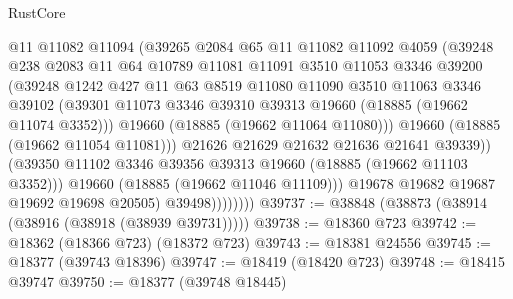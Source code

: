 \begin{lexlean}{RustCore}
\begin{coremodule}
                          @11
                          @11082
                          @11094
                          (@39265
                            @2084
                            @65
                            @11
                            @11082
                            @11092
                            @4059
                            (@39248
                              @238
                              @2083
                              @11
                              @64
                              @10789
                              @11081
                              @11091
                              @3510
                              @11053
                              @3346
                              @39200
                              (@39248
                                @1242
                                @427
                                @11
                                @63
                                @8519
                                @11080
                                @11090
                                @3510
                                @11063
                                @3346
                                @39102
                                (@39301
                                  @11073
                                  @3346
                                  @39310
                                  @39313
                                  @19660
                                  (@18885 (@19662 @11074 @3352)))
                                @19660
                                (@18885 (@19662 @11064 @11080)))
                              @19660
                              (@18885 (@19662 @11054 @11081)))
                            @21626
                            @21629
                            @21632
                            @21636
                            @21641
                            @39339))
                        (@39350 @11102 @3346 @39356 @39313 @19660 (@18885 (@19662 @11103 @3352)))
                        @19660
                        (@18885 (@19662 @11046 @11109)))
                      @19678
                      @19682
                      @19687
                      @19692
                      @19698
                      @20505)
                    @39498))))))))
@39737 := @38848 (@38873 (@38914 (@38916 (@38918 (@38939 @39731)))))
@39738 := @18360 @723
@39742 := @18362 (@18366 @723) (@18372 @723)
@39743 := @18381 @24556
@39745 := @18377 (@39743 @18396)
@39747 := @18419 (@18420 @723)
@39748 := @18415 @39747
@39750 := @18377 (@39748 @18445)

\end{coremodule}
\end{lexlean}
